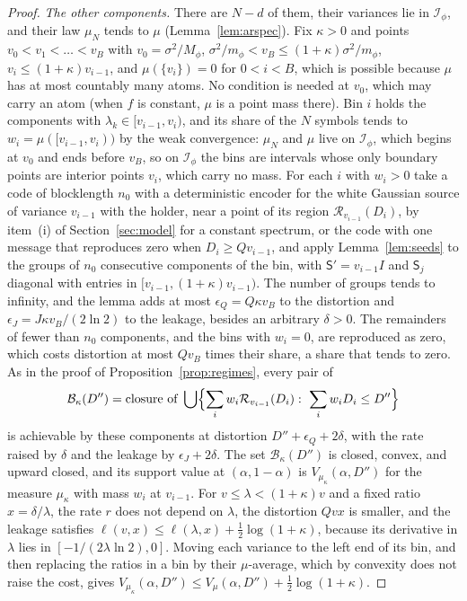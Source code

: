 \documentclass[11pt,onecolumn]{IEEEtran}
\begin{document}
\begin{proof}
\emph{The other components.} There are $N-d$ of them, their variances
lie in $\mathcal I_\phi$, and their law $\mu_N$ tends to $\mu$
(Lemma~\ref{lem:arspec}). Fix $\kappa>0$ and points
$v_0<v_1<\dots<v_B$ with $v_0=\sigma^2/M_\phi$,
$\sigma^2/m_\phi<v_B\le(1+\kappa)\sigma^2/m_\phi$,
$v_i\le(1+\kappa)v_{i-1}$, and $\mu(\{v_i\})=0$ for $0<i<B$, which is
possible because $\mu$ has at most countably many atoms. No condition is
needed at $v_0$, which may carry an atom (when $f$ is constant, $\mu$ is
a point mass there). Bin $i$ holds the components with
$\lambda_k\in[v_{i-1},v_i)$, and its share of the $N$ symbols tends to
$w_i=\mu([v_{i-1},v_i))$ by the weak convergence: $\mu_N$ and $\mu$ live
on $\mathcal I_\phi$, which begins at $v_0$ and ends before $v_B$, so on $\mathcal I_\phi$ the bins
are intervals whose only boundary points are interior points $v_i$,
which carry no mass. For each $i$ with $w_i>0$ take a code of
blocklength $n_0$ with a deterministic encoder for the white Gaussian
source of variance $v_{i-1}$ with the holder, near a point of its
region $\mathcal R_{v_{i-1}}(D_i)$, by item~(i) of
Section~\ref{sec:model} for a constant spectrum, or the code with one
message that reproduces zero when $D_i\ge Qv_{i-1}$, and apply
Lemma~\ref{lem:seeds} to the groups of $n_0$ consecutive components of
the bin, with $\mathsf S'=v_{i-1}I$ and $\mathsf S_j$ diagonal with
entries in $[v_{i-1},(1+\kappa)v_{i-1})$. The number of groups tends to
infinity, and the lemma adds at most $\epsilon_Q=Q\kappa v_B$ to the
distortion and $\epsilon_J=J\kappa v_B/(2\ln2)$ to the leakage, besides
an arbitrary $\delta>0$. The remainders of fewer than $n_0$ components,
and the bins with $w_i=0$, are reproduced as zero, which costs
distortion at most $Qv_B$ times their share, a share that tends to
zero. As in the proof of Proposition~\ref{prop:regimes}, every pair of
\[
\mathcal B_\kappa(D'')=\text{closure of }\bigcup\Bigl\{\sum_iw_i\mathcal R_{v_{i-1}}(D_i):\ \sum_iw_iD_i\le D''\Bigr\}
\]
is achievable by these components at distortion
$D''+\epsilon_Q+2\delta$, with the rate raised by $\delta$ and the
leakage by $\epsilon_J+2\delta$.
The set $\mathcal B_\kappa(D'')$ is closed, convex, and upward closed,
and its support value at $(\alpha,1-\alpha)$ is $V_{\mu_\kappa}(\alpha,D'')$
for the measure $\mu_\kappa$ with mass $w_i$ at $v_{i-1}$. For
$v\le\lambda<(1+\kappa)v$ and a fixed ratio $x=\delta/\lambda$, the rate
$r$ does not depend on $\lambda$, the distortion $Qvx$ is smaller, and
the leakage satisfies $\ell(v,x)\le\ell(\lambda,x)+\tfrac12\log(1+\kappa)$,
because its derivative in $\lambda$ lies in $[-1/(2\lambda\ln2),0]$.
Moving each variance to the left end of its bin, and then replacing
the ratios in a bin by their $\mu$-average, which by convexity does not
raise the cost, gives
$V_{\mu_\kappa}(\alpha,D'')\le V_\mu(\alpha,D'')+\tfrac12\log(1+\kappa)$.


\end{proof}
\end{document}
